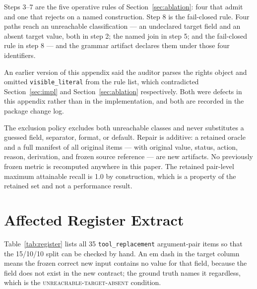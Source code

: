 \documentclass[11pt]{article}
\newcommand{\st}[1]{\textsc{\small #1}}
\newcommand{\dfam}[1]{\texttt{#1}}
\begin{document}
Steps 3--7 are the five operative rules of Section~\ref{sec:ablation}: four
that admit and one that rejects on a named construction. Step 8 is the
fail-closed rule. Four paths reach an unreachable classification --- an
undeclared target field and an absent target value, both in step 2; the named
join in step 5; and the fail-closed rule in step 8 --- and the grammar artifact
declares them under those four identifiers.

An earlier version of this appendix said the auditor parses the rights object
and omitted \texttt{visible\_literal} from the rule list, which contradicted
Section~\ref{sec:impl} and Section~\ref{sec:ablation} respectively. Both were
defects in this appendix rather than in the implementation, and both are
recorded in the package change log.

The exclusion policy excludes both unreachable classes and never substitutes a
guessed field, separator, format, or default. Repair is additive: a retained
oracle and a full manifest of all original items --- with original value,
status, action, reason, derivation, and frozen source reference --- are new
artifacts. No previously frozen metric is recomputed anywhere in this paper.
The retained pair-level maximum attainable recall is 1.0 by construction,
which is a property of the retained set and not a performance result.

\section{Affected Register Extract}
\label{app:register}

Table~\ref{tab:register} lists all 35 \dfam{tool\_replacement} argument-pair
items so that the 15/10/10 split can be checked by hand. An em dash in the
target column means the frozen correct new input contains no value for that
field, because the field does not exist in the new contract; the ground truth
names it regardless, which is the \st{unreachable-target-absent} condition.
\end{document}
